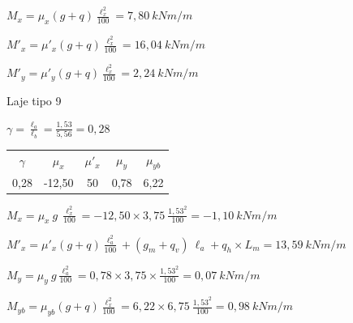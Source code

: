 \begin{resposta}
\begin{enumerate}[start=6]
        $M_x = \mu_x (g+q) \frac{\ell_x^2}{100} = 7,80 \ kN m/m$

        $M'_x = \mu'_x (g+q) \frac{\ell_x^2}{100} = 16,04 \ kN m/m$


        $M'_y = \mu'_y (g+q) \frac{\ell_x^2}{100} = 2,24 \ kN m/m$ \newline

        \newpage


        

        

        

        Laje tipo 9 \cite[tabela 2.3e]{tabelalajes}

        $\gamma = \frac{\ell_a}{\ell_b} = \frac{1,53}{5,56} = 0,28$

        \begin{table}[h]
            \centering
            \color{gray!80!black}
            \begin{tabular}{c c c c c}
                $\gamma$ & $\mu_x$ & $\mu'_x$ & $\mu_y$ & $\mu_{yb}$ \\
                0,28 & -12,50 & 50 & 0,78 & 6,22
            \end{tabular}
        \end{table}

        $M_x = \mu_x \ g \ \frac{\ell_x^2}{100} = -12,50 \times 3,75 \ \frac{1,53^2}{100} = -1,10 \ kN m/m$ \newline

        $M'_x = \mu'_x (g+q) \frac{\ell_a^2}{100} + (g_m + q_v) \ \ell_a + q_h \times L_m = 13,59 \ kN m/m$ 
        

        $M_y = \mu_y \ g \frac{\ell_a^2}{100} = 0,78 \times 3,75 \times \frac{1,53^2}{100} = 0,07 \ kN m/m$

        $M_{yb} = \mu_{yb} (g+q) \frac{\ell_x^2}{100} = 6,22 \times 6,75 \ \frac{1,53^2}{100} = 0,98 \ kN m/m$ \newline

        \newpage



\end{enumerate}
\end{resposta}
